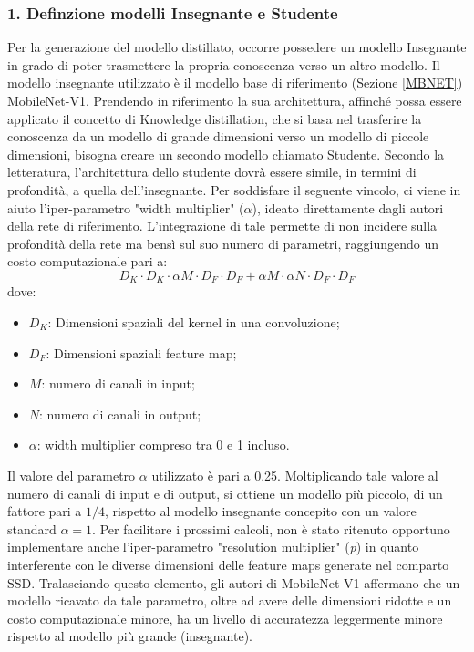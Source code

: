 \subsubsection{1. Definzione modelli Insegnante e Studente}
Per la generazione del modello distillato, occorre possedere un modello Insegnante in grado di poter trasmettere la propria conoscenza verso un altro modello. Il modello insegnante utilizzato è il modello base di riferimento (Sezione \ref{MBNET}) MobileNet-V1. Prendendo in riferimento la sua architettura, affinché possa essere applicato il concetto di Knowledge distillation, che si basa nel trasferire la conoscenza da un modello di grande dimensioni verso un modello di piccole dimensioni, bisogna creare un secondo modello chiamato Studente. Secondo la letteratura, l'architettura dello studente dovrà essere simile, in termini di profondità, a quella dell'insegnante. Per soddisfare il seguente vincolo,  ci viene in aiuto l'iper-parametro "width multiplier" ($\alpha$), ideato direttamente dagli autori della rete di riferimento. L'integrazione di tale permette di non incidere sulla profondità della rete ma bensì sul suo numero di parametri, raggiungendo un costo computazionale pari a:
\begin{equation}
    D_K \cdot D_K \cdot \alpha M \cdot D_F \cdot D_F + \alpha M \cdot \alpha N \cdot D_F \cdot D_F
\end{equation}
dove:
\begin{itemize}
    \item $D_K$: Dimensioni spaziali del kernel in una convoluzione;
    \item $D_F$: Dimensioni spaziali feature map;
    \item $M$: numero di canali in input;
    \item $N$: numero di canali in output;
    \item $\alpha$: width multiplier compreso tra 0 e 1 incluso.
\end{itemize}
Il valore del parametro $\alpha$ utilizzato è pari a 0.25. Moltiplicando tale valore al numero di canali di input e di output, si ottiene un modello più piccolo, di un fattore pari a $1/4$, rispetto al modello insegnante concepito con un valore standard $\alpha=1$. Per facilitare i prossimi calcoli, non è stato ritenuto opportuno implementare anche l'iper-parametro "resolution multiplier" (\emph{p}) in quanto interferente con le diverse dimensioni delle feature maps generate nel comparto SSD. Tralasciando questo elemento, gli autori di MobileNet-V1 affermano che un modello ricavato da tale parametro, oltre ad avere delle dimensioni ridotte e un costo computazionale minore, ha un livello di accuratezza leggermente minore rispetto al modello più grande (insegnante). 

